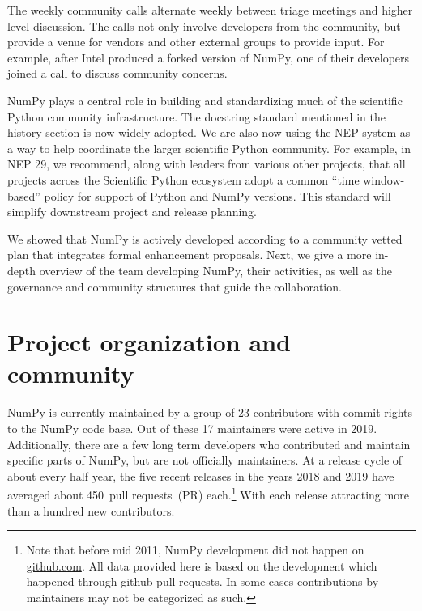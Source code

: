 The weekly community calls alternate weekly between triage meetings and
higher level discussion.  The calls not only involve developers from
the community, but provide a venue for vendors and other external
groups to provide input.  For example, after Intel produced a forked
version of NumPy, one of their developers joined a call to discuss
community concerns.

NumPy plays a central role in building and standardizing much of the scientific
Python community infrastructure.
The docstring standard mentioned in the history section is now widely adopted.
We are also now using the NEP system as a way to help coordinate the larger
scientific Python community.
For example, in NEP 29, we recommend, along with leaders from various other
projects, that all projects across the Scientific Python ecosystem adopt a
common ``time window-based'' policy for support of Python and NumPy versions.
This standard will simplify downstream project and release planning.


We showed that NumPy is actively developed according to a community
vetted plan that integrates formal enhancement proposals.  Next, we
give a more in-depth overview of the team developing NumPy, their
activities, as well as the governance and community structures that
guide the collaboration.

\section*{Project organization and community}

NumPy is currently maintained by a group of 23 contributors with commit rights
to the NumPy code base. Out of these 17 maintainers were active in 2019.
Additionally, there are a few long term developers who contributed and maintain
specific parts of NumPy, but are not officially maintainers.
At a release cycle of about every half year, the five recent releases in the years
2018 and 2019 have averaged about 450~pull requests~(PR) each.\footnote{
    Note that before mid 2011, NumPy development did not happen on \url{github.com}.
    All data provided here is based on the development which happened through github
    pull requests. In some cases contributions by maintainers may not be categorized as such.}
With each release attracting more than a hundred new contributors.


